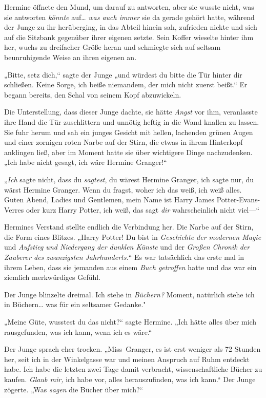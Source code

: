 {Hermine öffnete den Mund, um darauf zu antworten, aber sie wusste nicht, was sie antworten \emph{könnte} auf… \emph{was auch immer} sie da gerade gehört hatte, während der Junge zu ihr herüberging, in das Abteil hinein sah, zufrieden nickte und sich auf die Sitzbank gegenüber ihrer eigenen setzte. Sein Koffer wieselte hinter ihm her, wuchs zu dreifacher Größe heran und schmiegte sich auf seltsam beunruhigende Weise an ihren eigenen an.

„Bitte, setz dich,“ sagte der Junge „und würdest du bitte die Tür hinter dir schließen. Keine Sorge, ich beiße niemandem, der mich nicht zuerst beißt.“ Er begann bereits, den Schal von seinem Kopf abzuwickeln.

Die Unterstellung, dass dieser Junge dachte, sie hätte \emph{Angst} vor ihm, veranlasste ihre Hand die Tür zuschlittern und unnötig heftig in die Wand knallen zu lassen. Sie fuhr herum und sah ein junges Gesicht mit hellen, lachenden grünen Augen und einer zornigen roten Narbe auf der Stirn, die etwas in ihrem Hinterkopf anklingen ließ, aber im Moment hatte sie über wichtigere Dinge nachzudenken. „Ich habe nicht gesagt, ich wäre Hermine Granger!“

„\emph{Ich} sagte nicht, dass du \emph{sagtest}, du wärest Hermine Granger, ich sagte nur, du wärst Hermine Granger. Wenn du fragst, woher ich das weiß, ich weiß alles. Guten Abend, Ladies und Gentlemen, mein Name ist Harry James Potter-Evans-Verres oder kurz Harry Potter, ich weiß, das sagt \emph{dir} wahrscheinlich nicht viel—“

Hermines Verstand stellte endlich die Verbindung her. Die Narbe auf der Stirn, die Form eines Blitzes. „Harry Potter! Du bist in \emph{Geschichte der modernen Magie} und \emph{Aufstieg und Niedergang der dunklen Künste} und der \emph{Großen Chronik der Zauberer des zwanzigsten Jahrhunderts.}“ Es war tatsächlich das erste mal in ihrem Leben, dass sie jemanden aus einem \emph{Buch getroffen} hatte und das war ein ziemlich merkwürdiges Gefühl.

Der Junge blinzelte dreimal. Ich stehe in \emph{Büchern?} Moment, natürlich stehe ich in Büchern… was für ein seltsamer Gedanke."

„Meine Güte, wusstest du das nicht?“ sagte Hermine. „Ich hätte alles über mich rausgefunden, was ich kann, wenn ich es wäre.“

Der Junge sprach eher trocken. „Miss~Granger, es ist erst weniger als 72 Stunden her, seit ich in der Winkelgasse war und meinen Anspruch auf Ruhm entdeckt habe. Ich habe die letzten zwei Tage damit verbracht, wissenschaftliche Bücher zu kaufen. \emph{Glaub mir,} ich habe vor, alles herauszufinden, was ich kann.“ Der Junge zögerte. „Was \emph{sagen} die Bücher über mich?“

}
